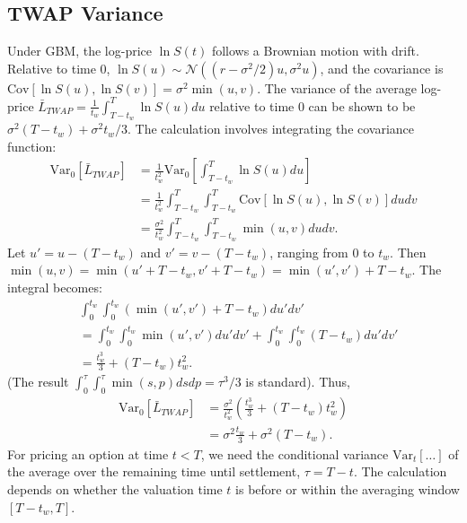 \documentclass[11pt]{article}
\theoremstyle{plain}
\begin{document}
\subsection{TWAP Variance}
\label{sec:twap_variance}

Under GBM, the log-price $\ln S(t)$ follows a Brownian motion with drift. Relative to time 0, $\ln S(u) \sim \mathcal{N}((r-\sigma^2/2)u, \sigma^2 u)$, and the covariance is $\mathrm{Cov}[\ln S(u),\ln S(v)] = \sigma^2 \min(u,v)$. The variance of the average log-price $\bar{L}_{TWAP} = \frac{1}{t_w} \int_{T-t_w}^T \ln S(u) du$ relative to time 0 can be shown to be $\sigma^2 (T-t_w) + \sigma^2 t_w/3$. The calculation involves integrating the covariance function:
\begin{align*}
    \mathrm{Var}_0[\bar{L}_{TWAP}] &= \frac{1}{t_w^2} \mathrm{Var}_0\left[ \int_{T-t_w}^T \ln S(u) du \right] \\
    &= \frac{1}{t_w^2} \int_{T-t_w}^T \int_{T-t_w}^T \mathrm{Cov}[\ln S(u), \ln S(v)] du dv \\
    &= \frac{\sigma^2}{t_w^2} \int_{T-t_w}^T \int_{T-t_w}^T \min(u,v) du dv.
\end{align*}
Let $u' = u - (T-t_w)$ and $v' = v - (T-t_w)$, ranging from $0$ to $t_w$. Then $\min(u,v) = \min(u'+T-t_w, v'+T-t_w) = \min(u',v') + T-t_w$. The integral becomes:
\begin{align*}
    &\int_{0}^{t_w} \int_{0}^{t_w} (\min(u',v') + T-t_w) du' dv' \\
    &= \int_{0}^{t_w} \int_{0}^{t_w} \min(u',v') du' dv' + \int_{0}^{t_w} \int_{0}^{t_w} (T-t_w) du' dv' \\
    &= \frac{t_w^3}{3} + (T-t_w)t_w^2.
\end{align*}
(The result $\int_0^\tau \int_0^\tau \min(s,p) ds dp = \tau^3/3$ is standard).
Thus,
\begin{align*}
\mathrm{Var}_0[\bar{L}_{TWAP}] &= \frac{\sigma^2}{t_w^2} \left( \frac{t_w^3}{3} + (T-t_w)t_w^2 \right) \\
&= \sigma^2 \frac{t_w}{3} + \sigma^2(T-t_w).
\end{align*}
For pricing an option at time $t < T$, we need the conditional variance $\mathrm{Var}_t[\dots]$ of the average over the remaining time until settlement, $\tau = T-t$. The calculation depends on whether the valuation time $t$ is before or within the averaging window $[T-t_w, T]$.
\end{document}
